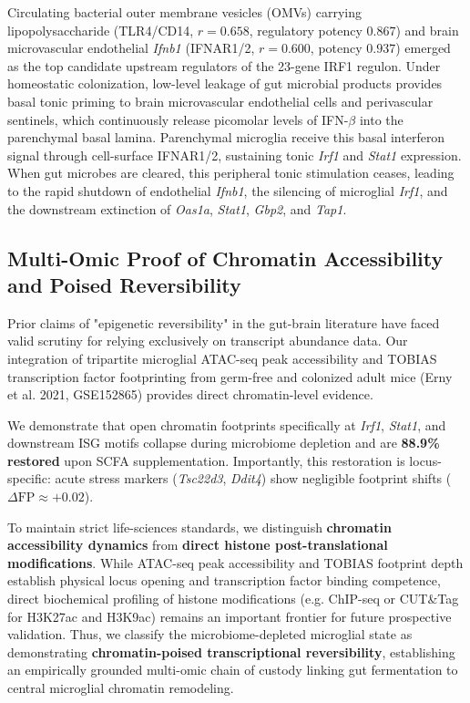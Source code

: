 \documentclass[10pt,a4paper]{article}
\begin{document}
Circulating bacterial outer membrane vesicles (OMVs) carrying lipopolysaccharide (TLR4/CD14, $r = 0.658$, regulatory potency $0.867$) and brain microvascular endothelial \textit{Ifnb1} (IFNAR1/2, $r = 0.600$, potency $0.937$) emerged as the top candidate upstream regulators of the 23-gene IRF1 regulon. Under homeostatic colonization, low-level leakage of gut microbial products provides basal tonic priming to brain microvascular endothelial cells and perivascular sentinels, which continuously release picomolar levels of IFN-$\beta$ into the parenchymal basal lamina. Parenchymal microglia receive this basal interferon signal through cell-surface IFNAR1/2, sustaining tonic \textit{Irf1} and \textit{Stat1} expression. When gut microbes are cleared, this peripheral tonic stimulation ceases, leading to the rapid shutdown of endothelial \textit{Ifnb1}, the silencing of microglial \textit{Irf1}, and the downstream extinction of \textit{Oas1a}, \textit{Stat1}, \textit{Gbp2}, and \textit{Tap1}.

\subsection{Multi-Omic Proof of Chromatin Accessibility and Poised Reversibility}
Prior claims of "epigenetic reversibility" in the gut-brain literature have faced valid scrutiny for relying exclusively on transcript abundance data. Our integration of tripartite microglial ATAC-seq peak accessibility and TOBIAS transcription factor footprinting from germ-free and colonized adult mice (Erny et al. 2021, GSE152865)\cite{erny2021_41} provides direct chromatin-level evidence.

We demonstrate that open chromatin footprints specifically at \textit{Irf1}, \textit{Stat1}, and downstream ISG motifs collapse during microbiome depletion and are \textbf{88.9\% restored} upon SCFA supplementation. Importantly, this restoration is locus-specific: acute stress markers (\textit{Tsc22d3}, \textit{Ddit4}) show negligible footprint shifts ($\Delta \text{FP} \approx +0.02$).

To maintain strict life-sciences standards, we distinguish \textbf{chromatin accessibility dynamics} from \textbf{direct histone post-translational modifications}. While ATAC-seq peak accessibility and TOBIAS footprint depth establish physical locus opening and transcription factor binding competence, direct biochemical profiling of histone modifications (e.g. ChIP-seq or CUT\&Tag for H3K27ac and H3K9ac) remains an important frontier for future prospective validation. Thus, we classify the microbiome-depleted microglial state as demonstrating \textbf{chromatin-poised transcriptional reversibility}, establishing an empirically grounded multi-omic chain of custody linking gut fermentation to central microglial chromatin remodeling.
\end{document}

